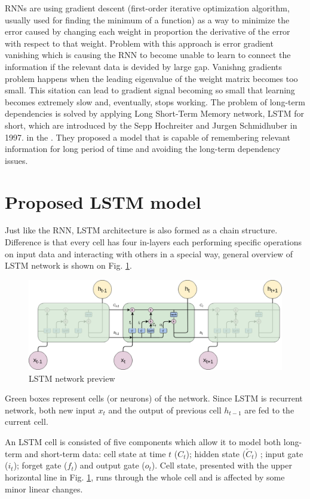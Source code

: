 \documentclass[11pt, a4paper]{article} %
\begin{document}
RNNs are using gradient descent (first-order iterative optimization algorithm, usually used for finding the minimum of a function) as a way to minimize the error caused by changing each weight in proportion the derivative of the error with respect to that weight. Problem with this approach is error gradient vanishing which is causing the RNN to become unable to learn to connect the information if the relevant data is devided by large gap. 
Vanishng gradients problem happens when the leading eigenvalue of the weight matrix becomes too small. This sitation can lead to gradient signal becoming so small that learning becomes extremely slow and, eventually, stops working. 
The problem of long-term dependencies is solved by applying Long Short-Term Memory network, LSTM for short, which are introduced by the Sepp Hochreiter and Jurgen Schmidhuber in 1997. in the \cite{Hochreiter_LSTM}. They proposed a model that is capable of remembering relevant information for long period of time and avoiding the long-term dependency issues. 

\section{Proposed LSTM model}

Just like the RNN, LSTM architecture is also formed as a chain structure. Difference is that every cell has four in-layers each performing specific operations on input data and interacting with others in a special way, general overview of LSTM network is shown on Fig. \ref{lstm}.
\begin{figure}
	\centering
	\includegraphics[scale=.4]{images/LSTM.png} %
	\caption{LSTM network preview}
	\label{lstm} 
\end{figure}
Green boxes represent cells (or neurons) of the network. Since LSTM is recurrent network, both new input $ x_{t} $ and the output of previous cell $ h_{t-1} $ are fed to the current cell.

An LSTM cell is consisted of five components which allow it to model both long-term and short-term data: cell state at time $ t $ ($ C_{t} $); hidden state ($ \tilde{C}_{t}) $ ; input gate ($ i_{t} $); forget gate ($ f_{t} $) and output gate ($ o_{t} $).
Cell state, presented with the upper horizontal line in Fig. \ref{lstm}, runs through the whole cell and is affected by some minor linear changes.
\end{document}
